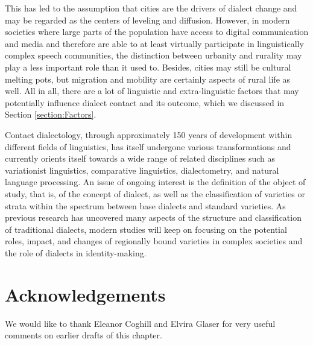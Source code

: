 \documentclass[output=paper]{langscibook}
\begin{document}
This has led to the assumption that cities are the drivers of dialect change and may be regarded as the centers of leveling and diffusion. However, in modern societies where large parts of the population have access to digital communication and media and therefore are able to at least virtually participate in linguistically complex speech communities, the distinction between urbanity and rurality may play a less important role than it used to. Besides, cities may still be cultural melting pots, but migration and mobility are certainly aspects of rural life as well. All in all, there are a lot of linguistic and extra-linguistic factors that may potentially influence dialect contact and its outcome, which we discussed in Section \ref{section:Factors}.  

Contact dialectology, through approximately 150 years of development within different fields of linguistics, has itself undergone various transformations and currently orients itself towards a wide range of related disciplines such as variationist linguistics, comparative linguistics, dialectometry, and natural language processing. An issue of ongoing interest is the definition of the object of study, that is, of the concept of dialect, as well as the classification of varieties or strata within the spectrum between base dialects and standard varieties. As previous research has uncovered many aspects of the structure and classification of traditional dialects, modern studies will keep on focusing on the potential roles, impact, and changes of regionally bound varieties in complex societies and the role of dialects in identity-making.  


\section*{Acknowledgements}
We would like to thank Eleanor Coghill and Elvira Glaser for very useful comments on earlier drafts of this chapter.

\printbibliography[heading=subbibliography,notkeyword=this]
\end{document}
